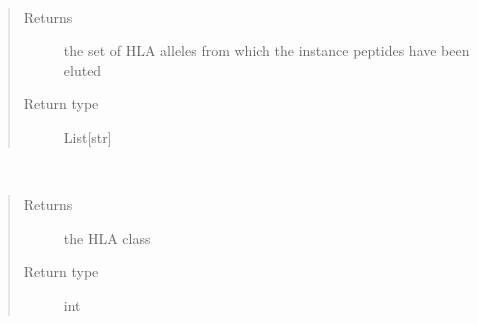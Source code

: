 \documentclass[letterpaper,10pt,english]{sphinxmanual}
\begin{document}
\begin{fulllineitems}
\begin{fulllineitems}
\end{fulllineitems}


\begin{fulllineitems}
\label{\detokenize{IPTK.Classes:IPTK.Classes.Experiment.Experiment.get_hla_allele}}~\begin{quote}\begin{description}
\item[{Returns}] \leavevmode
the set of HLA alleles from which the instance peptides have been eluted

\item[{Return type}] \leavevmode
List{[}str{]}

\end{description}\end{quote}

\end{fulllineitems}


\begin{fulllineitems}
\label{\detokenize{IPTK.Classes:IPTK.Classes.Experiment.Experiment.get_hla_class}}~\begin{quote}\begin{description}
\item[{Returns}] \leavevmode
the HLA class

\item[{Return type}] \leavevmode
int

\end{description}\end{quote}

\end{fulllineitems}



\end{fulllineitems}
\end{document}
